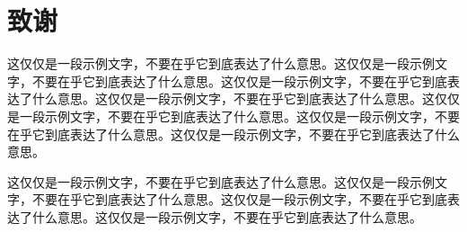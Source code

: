 \section{致\quad 谢} %

这仅仅是一段示例文字，不要在乎它到底表达了什么意思。这仅仅是一段示例文字，不要在乎它到底表达了什么意思。这仅仅是一段示例文字，不要在乎它到底表达了什么意思。这仅仅是一段示例文字，不要在乎它到底表达了什么意思。这仅仅是一段示例文字，不要在乎它到底表达了什么意思。这仅仅是一段示例文字，不要在乎它到底表达了什么意思。这仅仅是一段示例文字，不要在乎它到底表达了什么意思。

这仅仅是一段示例文字，不要在乎它到底表达了什么意思。这仅仅是一段示例文字，不要在乎它到底表达了什么意思。这仅仅是一段示例文字，不要在乎它到底表达了什么意思。这仅仅是一段示例文字，不要在乎它到底表达了什么意思。


\newpage
